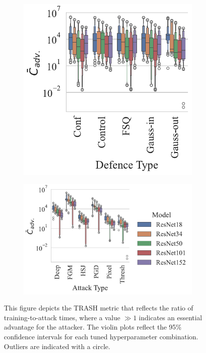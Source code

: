 \begin{figure}[!ht]
    \centering
    \begin{subfigure}
        \centering
        \includegraphics[width=.32\textwidth]{plots/trash_score_vs_defence_type.pdf}
    \end{subfigure}
    \begin{subfigure}
        \centering
        \includegraphics[width=.50\textwidth]{plots/trash_score_vs_attack_type.pdf}
    \end{subfigure}
    \caption{This figure depicts the TRASH metric that reflects the ratio of training-to-attack times, where a value $\gg 1 $  indicates an essential advantage for the attacker. The violin plots reflect the 95\% confidence intervals for each tuned hyperparameter combination. Outliers are indicated with a circle.}
	\label{fig:failures_per_train_time}
\end{figure}